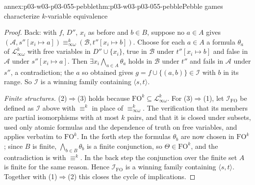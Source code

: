 \begin{annexitem}{annex:p03-w03-p03-055-pebble}{thm:p03-w03-p03-055-pebble}{Pebble games characterize \(k\)-variable equivalence}
\begin{proof}
Back: with \(f\), \(D''\), \(x_i\) as before and \(b\in B\), suppose no
\(a\in A\) gives
\((\mathcal A,s''[x_i\mapsto a])\equiv^k_{\infty\omega}(\mathcal B,t''[x_i\mapsto b])\).
Choose for each \(a\in A\) a formula \(\theta_a\) of
\(\mathcal L^k_{\infty\omega}\) with free variables in \(D''\cup\{x_i\}\),
true in \(\mathcal B\) under \(t''[x_i\mapsto b]\) and false in
\(\mathcal A\) under \(s''[x_i\mapsto a]\). Then
\(\exists x_i\bigwedge_{a\in A}\theta_a\) holds in \(\mathcal B\) under
\(t''\) and fails in \(\mathcal A\) under \(s''\), a contradiction; the
\(a\) so obtained gives \(g=f\cup\{(a,b)\}\in\mathcal I\) with \(b\) in its
range. So \(\mathcal I\) is a winning family containing
\(\langle s,t\rangle\).

\emph{Finite structures.} (2)\(\Rightarrow\)(3) holds because
\(\mathrm{FO}^k\subseteq\mathcal L^k_{\infty\omega}\). For
(3)\(\Rightarrow\)(1), let \(\mathcal I_{\mathrm{FO}}\) be defined as
\(\mathcal I\) above with \(\equiv^k\) in place of
\(\equiv^k_{\infty\omega}\). The verification that its members are partial
isomorphisms with at most \(k\) pairs, and that it is closed under subsets,
used only atomic formulas and the dependence of truth on free variables, and
applies verbatim to \(\mathrm{FO}^k\). In the forth step the formulas
\(\theta_b\) are now chosen in \(\mathrm{FO}^k\); since \(B\) is finite,
\(\bigwedge_{b\in B}\theta_b\) is a finite conjunction, so
\(\Theta\in\mathrm{FO}^k\), and the contradiction is with \(\equiv^k\). In
the back step the conjunction over the finite set \(A\) is finite for the
same reason. Hence \(\mathcal I_{\mathrm{FO}}\) is a winning family
containing \(\langle s,t\rangle\). Together with (1)\(\Rightarrow\)(2) this
closes the cycle of implications.
\end{proof}
\end{annexitem}

